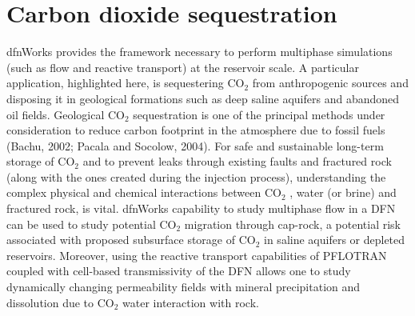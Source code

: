 \documentclass[letterpaper,10pt,english]{sphinxmanual}
\begin{document}
\section{Carbon dioxide sequestration}
\label{\detokenize{applications:carbon-dioxide-sequestration}}
dfnWorks provides the framework necessary to perform multiphase simulations (such as flow and reactive transport) at the reservoir scale. A particular application, highlighted here, is sequestering CO$_{\text{2}}$  from anthropogenic sources and disposing it in geological formations such as deep saline aquifers and abandoned oil fields. Geological CO$_{\text{2}}$  sequestration is one of the principal methods under consideration to reduce carbon footprint in the atmosphere due to fossil fuels (Bachu, 2002; Pacala and Socolow, 2004). For safe and sustainable long-term storage of CO$_{\text{2}}$  and to prevent leaks through existing faults and fractured rock (along with the ones created during the injection process), understanding the complex physical and chemical interactions between CO$_{\text{2}}$ , water (or brine) and fractured rock, is vital. dfnWorks capability to study multiphase flow in a DFN can be used to study potential CO$_{\text{2}}$  migration through cap-rock, a potential risk associated with proposed subsurface storage of CO$_{\text{2}}$  in saline aquifers or depleted reservoirs. Moreover, using the reactive transport capabilities of PFLOTRAN coupled with cell-based transmissivity of the DFN allows one to study dynamically changing permeability fields with mineral precipitation and dissolution due to CO$_{\text{2}}$ \textendash{}water interaction with rock.

\begin{figure}[htbp]
\centering
\capstart

\noindent{}
\caption{}\label{\detokenize{applications:id1}}\end{figure}
\end{document}
